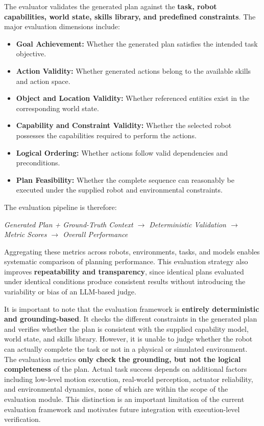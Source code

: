\documentclass[12pt,a4paper]{article}
\begin{document}
The evaluator validates the generated plan against the \textbf{task, robot capabilities, world state, skills library, and predefined constraints}.
The major evaluation dimensions include:

\begin{itemize}
  \item \textbf{Goal Achievement:} Whether the generated plan satisfies the intended task objective.
  \item \textbf{Action Validity:} Whether generated actions belong to the available skills and action space.
  \item \textbf{Object and Location Validity:} Whether referenced entities exist in the corresponding world state.
  \item \textbf{Capability and Constraint Validity:} Whether the selected robot possesses the capabilities required to perform the actions.
  \item \textbf{Logical Ordering:} Whether actions follow valid dependencies and preconditions.
  \item \textbf{Plan Feasibility:} Whether the complete sequence can reasonably be executed under the supplied robot and environmental constraints.
\end{itemize}

The evaluation pipeline is therefore:

\begin{center}
\textit{Generated Plan + Ground-Truth Context $\rightarrow$ Deterministic Validation $\rightarrow$ Metric Scores $\rightarrow$ Overall Performance}
\end{center}

Aggregating these metrics across robots, environments, tasks, and models enables systematic comparison of planning performance.
This evaluation strategy also improves \textbf{repeatability and transparency}, since identical plans evaluated under identical conditions produce consistent results without introducing the variability or bias of an LLM-based judge.

It is important to note that the evaluation framework is \textbf{entirely deterministic and grounding-based}.
It checks the different constraints in the generated plan and verifies whether the plan is consistent with the supplied capability model, world state, and skills library.
However, it is unable to judge whether the robot can actually complete the task or not in a physical or simulated environment.
The evaluation metrics \textbf{only check the grounding, but not the logical completeness} of the plan.
Actual task success depends on additional factors including low-level motion execution, real-world perception, actuator reliability, and environmental dynamics, none of which are within the scope of the evaluation module.
This distinction is an important limitation of the current evaluation framework and motivates future integration with execution-level verification.
\end{document}

